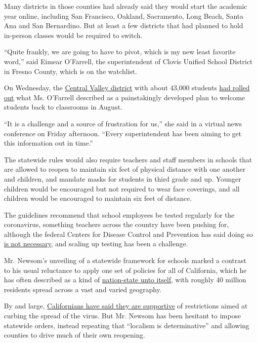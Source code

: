 Many districts in those counties had already said they would start the
academic year online, including San Francisco, Oakland, Sacramento, Long
Beach, Santa Ana and San Bernardino. But at least a few districts that
had planned to hold in-person classes would be required to switch.

``Quite frankly, we are going to have to pivot, which is my new least
favorite word,'' said Eimear O'Farrell, the superintendent of Clovis
Unified School District in Fresno County, which is on the watchlist.

On Wednesday, the
\href{https://www.cusd.com/CUSDAt-A-Glance.aspx}{Central Valley
district} with about 43,000 students
\href{https://www.fresnobee.com/news/coronavirus/article244300057.html}{had
rolled out} what Ms. O'Farrell described as a painstakingly developed
plan to welcome students back to classrooms in August.

``It is a challenge and a source of frustration for us,'' she said in a
virtual news conference on Friday afternoon. ``Every superintendent has
been aiming to get this information out in time.''

The statewide rules would also require teachers and staff members in
schools that are allowed to reopen to maintain six feet of physical
distance with one another and children, and mandate masks for students
in third grade and up. Younger children would be encouraged but not
required to wear face coverings, and all children would be encouraged to
maintain six feet of distance.

The guidelines recommend that school employees be tested regularly for
the coronavirus, something teachers across the country have been pushing
for, although the federal Centers for Disease Control and Prevention has
said doing so
\href{https://www.cdc.gov/coronavirus/2019-ncov/community/schools-childcare/k-12-testing.html}{is
not necessary}, and scaling up testing has been a challenge.

Mr. Newsom's unveiling of a statewide framework for schools marked a
contrast to his usual reluctance to apply one set of policies for all of
California, which he has often described as a kind of
\href{https://www.nytimes3xbfgragh.onion/2020/04/14/us/california-coronavirus-newsom-nation-state.html}{nation-state
unto itself}, with roughly 40 million residents spread across a vast and
varied geography.

By and large,
\href{https://www.nytimes3xbfgragh.onion/2020/06/04/us/california-newsom-coronavirus.html}{Californians
have said they are supportive} of restrictions aimed at curbing the
spread of the virus. But Mr. Newsom has been hesitant to impose
statewide orders, instead repeating that ``localism is determinative''
and allowing counties to drive much of their own reopening.

